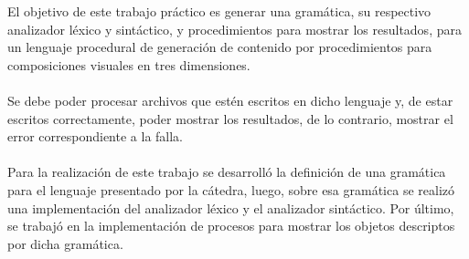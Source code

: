 El objetivo de este trabajo pr\'actico es generar una gram\'atica, su respectivo analizador l\'exico y sint\'actico, y procedimientos para mostrar los resultados, para un lenguaje procedural de generaci\'on de contenido por procedimientos para composiciones visuales en tres dimensiones. \\
\\
Se debe poder procesar archivos que est\'en escritos en dicho lenguaje y, de estar escritos correctamente, poder mostrar los resultados, de lo contrario, mostrar el error correspondiente a la falla. \\
\\
Para la realizaci\'on de este trabajo se desarroll\'o la definici\'on de una gram\'atica para el lenguaje presentado por la c\'atedra, luego, sobre esa gram\'atica se realiz\'o una implementaci\'on del analizador l\'exico y el analizador sint\'actico. Por \'ultimo, se trabaj\'o en la implementaci\'on de procesos para mostrar los objetos descriptos por dicha gram\'atica.\\
